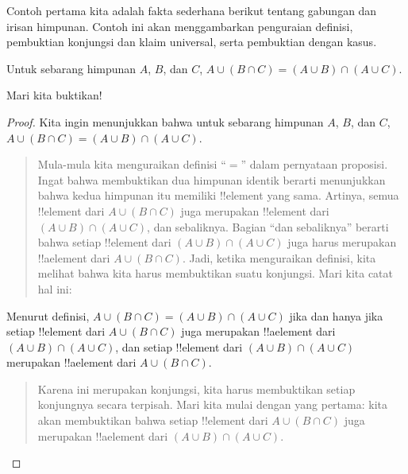 \documentclass[../../../include/open-logic-section]{subfiles}
\begin{document}


Contoh pertama kita adalah fakta sederhana berikut tentang gabungan
dan irisan himpunan. Contoh ini akan menggambarkan penguraian definisi,
pembuktian konjungsi dan klaim universal, serta pembuktian dengan kasus.

\begin{prop}
Untuk sebarang himpunan $A$, $B$, dan $C$, $A \cup (B \cap C) = (A
\cup B) \cap (A \cup C)$.
\end{prop}

Mari kita buktikan!{}

\begin{proof}
Kita ingin menunjukkan bahwa untuk sebarang himpunan $A$, $B$, dan
$C$, $A \cup (B \cap C) = (A \cup B) \cap (A \cup C)$.
\begin{quote}
Mula-mula kita menguraikan definisi ``$=$'' dalam pernyataan
proposisi. Ingat bahwa membuktikan dua himpunan identik berarti
menunjukkan bahwa kedua himpunan itu memiliki !!{element} yang sama.
Artinya, semua !!{element} dari $A \cup (B \cap C)$ juga merupakan
!!{element} dari $(A \cup B) \cap (A \cup C)$, dan sebaliknya. Bagian
``dan sebaliknya'' berarti bahwa setiap !!{element} dari $(A \cup B)
\cap (A \cup C)$ juga harus merupakan !!a{element} dari $A \cup (B
\cap C)$. Jadi, ketika menguraikan definisi, kita melihat bahwa kita
harus membuktikan suatu konjungsi. Mari kita catat hal ini:
\end{quote}
Menurut definisi, $A \cup (B \cap C) = (A \cup B) \cap (A \cup C)$
jika dan hanya jika setiap !!{element} dari $A \cup (B \cap C)$ juga
merupakan !!a{element} dari $(A \cup B) \cap (A \cup C)$, dan setiap
!!{element} dari $(A \cup B) \cap (A \cup C)$ merupakan !!a{element}
dari $A \cup (B \cap C)$.
\begin{quote}
Karena ini merupakan konjungsi, kita harus membuktikan setiap
konjungnya secara terpisah. Mari kita mulai dengan yang pertama: kita
akan membuktikan bahwa setiap !!{element} dari $A \cup (B \cap C)$
juga merupakan !!a{element} dari $(A \cup B) \cap (A \cup C)$.


\end{quote}
\end{proof}
\end{document}
